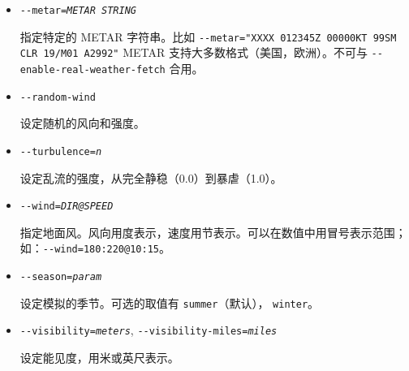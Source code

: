 \begin{itemize}
{\begin{itemize}
   控制是否启用实时获取天气信息。

\item{\texttt{-$ $-metar={\it METAR STRING}}}

  指定特定的 METAR 字符串。比如 \texttt{-$ $-metar="XXXX 012345Z 00000KT 99SM CLR 19/M01 A2992"} METAR 支持大多数格式（美国，欧洲）。不可与 \texttt{-$ $-enable-real-weather-fetch} 合用。

\item{\texttt{-$ $-random-wind}}

  设定随机的风向和强度。

\item{\texttt{-$ $-turbulence={\it n}}}

  设定乱流的强度，从完全静稳（0.0）到暴虐（1.0）。

\item{\texttt{-$ $-wind={\it DIR@SPEED}}}

  指定地面风。风向用度表示，速度用节表示。可以在数值中用冒号表示范围；如：\texttt{-$ $-wind=180:220@10:15}。

\item{\texttt{-$ $-season={\it param}}}

  设定模拟的季节。可选的取值有 \texttt{summer}（默认）， \texttt{winter}。

\item{\texttt{-$ $-visibility={\it meters}}, \texttt{-$ $-visibility-miles={\it miles}}}

  设定能见度，用米或英尺表示。

  \end{itemize}
}
\fi





\end{itemize}
